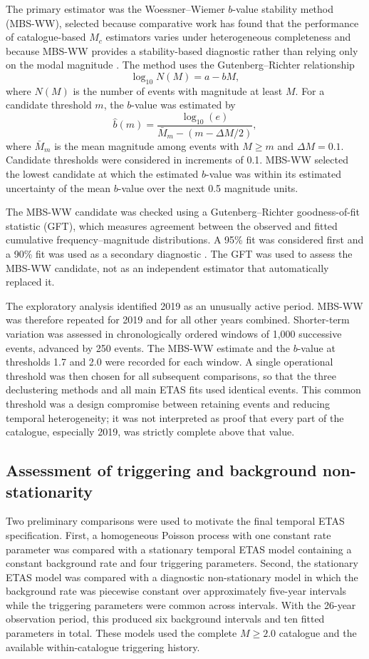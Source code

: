 The primary estimator was the Woessner--Wiemer $b$-value stability method
(MBS-WW), selected because comparative work has found that the performance of
catalogue-based $M_c$ estimators varies under heterogeneous completeness and
because MBS-WW provides a stability-based diagnostic rather than relying only
on the modal magnitude \citep{wang2025magnitude}. The method uses the
Gutenberg--Richter relationship
\[
\log_{10}N(M)=a-bM,
\]
where $N(M)$ is the number of events with magnitude at least $M$. For a
candidate threshold $m$, the $b$-value was estimated by
\[
\hat b(m)=\frac{\log_{10}(e)}
{\bar M_m-(m-\Delta M/2)},
\]
where $\bar M_m$ is the mean magnitude among events with $M\geq m$ and
$\Delta M=0.1$. Candidate thresholds were considered in increments of 0.1.
MBS-WW selected the lowest candidate at which the estimated $b$-value was
within its estimated uncertainty of the mean $b$-value over the next 0.5
magnitude units.

The MBS-WW candidate was checked using a Gutenberg--Richter goodness-of-fit
statistic (GFT), which measures agreement between the observed and fitted
cumulative frequency--magnitude distributions. A 95\% fit was considered
first and a 90\% fit was used as a secondary diagnostic
\citep{wang2025magnitude,pavlenko2022comparative}. The GFT was used to assess
the MBS-WW candidate, not as an independent estimator that automatically
replaced it.

The exploratory analysis identified 2019 as an unusually active period.
MBS-WW was therefore repeated for 2019 and for all other years combined.
Shorter-term variation was assessed in chronologically ordered windows of
1,000 successive events, advanced by 250 events. The MBS-WW estimate and
the $b$-value at thresholds 1.7 and 2.0 were recorded for each window. A
single operational threshold was then chosen for all subsequent comparisons,
so that the three declustering methods and all main ETAS fits used identical
events. This common threshold was a design compromise between retaining
events and reducing temporal heterogeneity; it was not interpreted as proof
that every part of the catalogue, especially 2019, was strictly complete
above that value.

\subsection{Assessment of triggering and background non-stationarity}
\label{sec:nonstationarity_screening}

Two preliminary comparisons were used to motivate the final temporal ETAS
specification. First, a homogeneous Poisson process with one constant rate
parameter was compared with a stationary temporal ETAS model containing a
constant background rate and four triggering parameters. Second, the
stationary ETAS model was compared with a diagnostic non-stationary model in
which the background rate was piecewise constant over approximately five-year
intervals while the triggering parameters were common across intervals. With
the 26-year observation period, this produced six background intervals and
ten fitted parameters in total. These models used the complete $M\geq2.0$
catalogue and the available within-catalogue triggering history.


